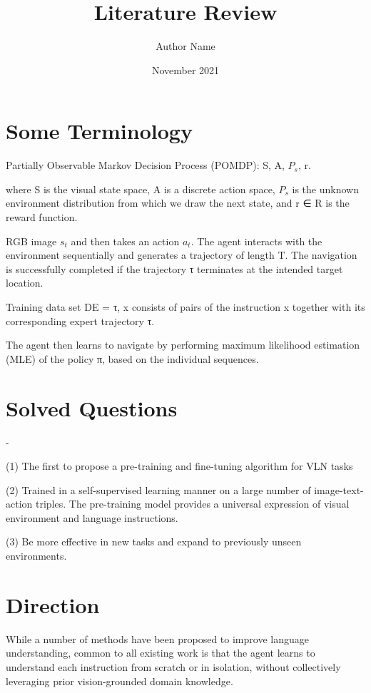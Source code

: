 \documentclass{article}
\title{Literature Review }
\author{Author Name}
\date{November 2021}
\begin{document}
\maketitle

\section{Some Terminology}


Partially Observable Markov Decision Process (POMDP): S, A, $P_s$, r.

where S is the visual state space, A is a discrete action space, $P_s$ is the unknown environment distribution from which we draw the next state, and r ∈ R is the reward function.

RGB image $s_t$  and then takes an action $a_t$. The agent interacts with the environment sequentially and generates a trajectory of length T. The navigation is successfully completed if the trajectory τ terminates at the intended target location.

Training data set DE = {τ, x} consists of pairs of the instruction x together with its corresponding expert trajectory τ.

The agent then learns to navigate by performing maximum likelihood estimation (MLE) of the policy π, based on the individual sequences.


\section{Solved Questions}
-

(1) The first to propose a pre-training and fine-tuning algorithm for VLN tasks

(2) Trained in a self-supervised learning manner on a large number of image-text-action triples. The pre-training model provides a universal expression of visual environment and language instructions.

(3) Be more effective in new tasks and expand to previously unseen environments.

\section{Direction}
While a number of methods have been proposed to improve language understanding, common to all existing work is that the agent learns to understand each instruction from scratch or in isolation, without collectively leveraging prior vision-grounded domain knowledge.
\end{document}
